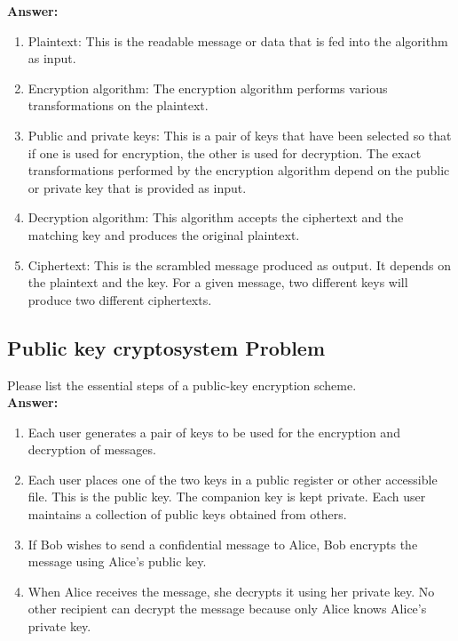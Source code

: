 \documentclass[paper=a4, fontsize=11pt]{scrartcl} %
\numberwithin{equation}{section} %
\numberwithin{figure}{section} %
\numberwithin{table}{section} %
\begin{document}
 \textbf{Answer:}

 \begin{enumerate}
 \item Plaintext: This is the readable message or data that is fed into the algorithm as input.
 \item Encryption algorithm: The encryption algorithm performs various transformations on the plaintext.
 \item Public and private keys: This is a pair of keys that have been selected so that if one is used for encryption, the other is used for decryption. The exact transformations performed by the encryption algorithm depend on the public or private key that is provided as input.
 \item Decryption algorithm: This algorithm accepts the ciphertext and the matching key and produces the original plaintext.
 \item Ciphertext: This is the scrambled message produced as output. It depends on the plaintext and the key. For a given message, two different keys will produce two different ciphertexts.
 \end{enumerate}

 \subsection{Public key cryptosystem Problem \uppercase\expandafter{}}

 Please list the essential steps of a public-key encryption scheme.\\

 \textbf{Answer:}

 \begin{enumerate}
 \item Each user generates a pair of keys to be used for the encryption and decryption of messages.
 \item Each user places one of the two keys in a public register or other accessible file. This is the public key. The companion key is kept private. Each user maintains a collection of public keys obtained from others.
 \item If Bob wishes to send a confidential message to Alice, Bob encrypts the message using Alice's public key.
 \item When Alice receives the message, she decrypts it using her private key. No other recipient can decrypt the message because only Alice knows Alice's private key.
 \end{enumerate}
\end{document}
